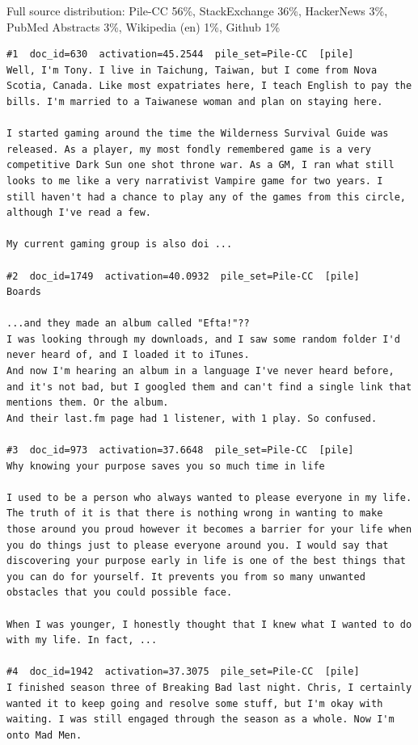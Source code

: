 Full source distribution: Pile-CC 56\%, StackExchange 36\%, HackerNews 3\%, PubMed Abstracts 3\%, Wikipedia (en) 1\%, Github 1\%

\begin{verbatim}
#1  doc_id=630  activation=45.2544  pile_set=Pile-CC  [pile]
Well, I'm Tony. I live in Taichung, Taiwan, but I come from Nova Scotia, Canada. Like most expatriates here, I teach English to pay the bills. I'm married to a Taiwanese woman and plan on staying here.

I started gaming around the time the Wilderness Survival Guide was released. As a player, my most fondly remembered game is a very competitive Dark Sun one shot throne war. As a GM, I ran what still looks to me like a very narrativist Vampire game for two years. I still haven't had a chance to play any of the games from this circle, although I've read a few.

My current gaming group is also doi ...

#2  doc_id=1749  activation=40.0932  pile_set=Pile-CC  [pile]
Boards

...and they made an album called "Efta!"??
I was looking through my downloads, and I saw some random folder I'd never heard of, and I loaded it to iTunes.
And now I'm hearing an album in a language I've never heard before, and it's not bad, but I googled them and can't find a single link that mentions them. Or the album.
And their last.fm page had 1 listener, with 1 play. So confused.

#3  doc_id=973  activation=37.6648  pile_set=Pile-CC  [pile]
Why knowing your purpose saves you so much time in life

I used to be a person who always wanted to please everyone in my life. The truth of it is that there is nothing wrong in wanting to make those around you proud however it becomes a barrier for your life when you do things just to please everyone around you. I would say that discovering your purpose early in life is one of the best things that you can do for yourself. It prevents you from so many unwanted obstacles that you could possible face.

When I was younger, I honestly thought that I knew what I wanted to do with my life. In fact, ...

#4  doc_id=1942  activation=37.3075  pile_set=Pile-CC  [pile]
I finished season three of Breaking Bad last night. Chris, I certainly wanted it to keep going and resolve some stuff, but I'm okay with waiting. I was still engaged through the season as a whole. Now I'm onto Mad Men.


\end{verbatim}
